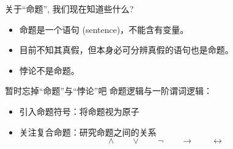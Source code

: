 \begin{frame}{关于``命题'', 我们现在知道些什么?}
  \begin{itemize}
    \setlength{\itemsep}{6pt}
    \item 命题是一个语句 (sentence)，不能含有变量。
    \item 目前不知其真假，但本身必可分辨真假的语句也是命题。
    \item 悖论不是命题。
  \end{itemize}
\end{frame}

\begin{frame}{暂时忘掉``命题''与``悖论''吧}
  命题逻辑与一阶谓词逻辑：
  \begin{itemize}
    \item 引入命题符号：将命题视为原子
    \item 关注复合命题：研究命题之间的关系 
      \[
	\land \qquad \lor \qquad \lnot \qquad \to \qquad \leftrightarrow
      \]
  \end{itemize}
\end{frame}
